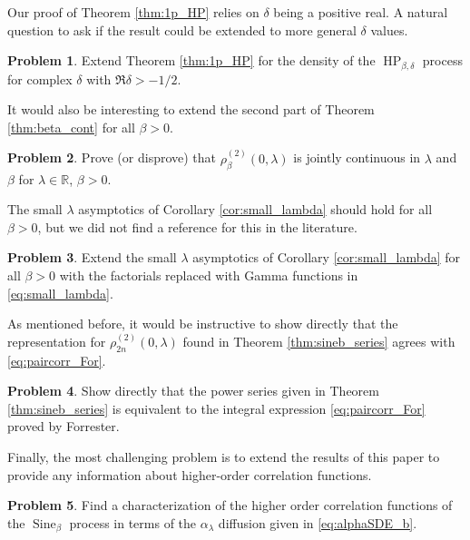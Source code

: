 \documentclass[12pt]{article}
\theoremstyle{definition} %
\newtheorem{problem}{Problem}
\newcommand{\R}{{\mathbb R}}
\theoremstyle{remark} %
\newcommand{\Sineb}{\operatorname{Sine}_{\beta}}
\newcommand{\HPb}{\operatorname{HP}_{\beta, \delta}}
\begin{document}
Our proof of Theorem \ref{thm:1p_HP} relies on $\delta$ being a positive real. A natural question to ask if the result could be extended to more general $\delta$ values.
\begin{problem}
    Extend Theorem \ref{thm:1p_HP} for the density of the $\HPb$ process for complex $\delta$ with $\Re \delta>-1/2$.
\end{problem}

It would also be interesting to extend the second part of Theorem \ref{thm:beta_cont} for all $\beta>0$.
\begin{problem}
    Prove (or disprove) that $\rho_{\beta}^{(2)}(0,\lambda)$ is jointly continuous in $\lambda$ and $\beta$ for $\lambda\in \R$, $\beta>0$. 
\end{problem}

The small $\lambda$ asymptotics of Corollary \ref{cor:small_lambda} should hold for all $\beta>0$, but we did not find a reference for this in the literature.  

\begin{problem}
Extend the small $\lambda$ asymptotics of Corollary \ref{cor:small_lambda} for all $\beta>0$ with the factorials replaced with Gamma functions in \eqref{eq:small_lambda}.
\end{problem}

As mentioned before, it would be instructive to show directly that the representation for $\rho^{(2)}_{2n}(0,\lambda)$ found in Theorem \ref{thm:sineb_series} agrees with \eqref{eq:paircorr_For}.

\begin{problem}
    Show directly that the power series given in Theorem \ref{thm:sineb_series} is equivalent to the integral expression \eqref{eq:paircorr_For} proved by Forrester.
\end{problem}

Finally, the most challenging problem is to extend the results of this paper to provide any information about higher-order correlation functions.


\begin{problem}
Find a characterization of the higher order correlation functions of the $\Sineb$ process in terms of the $\alpha_\lambda$ diffusion given in \eqref{eq:alphaSDE_b}.
\end{problem}






%
\end{document}
